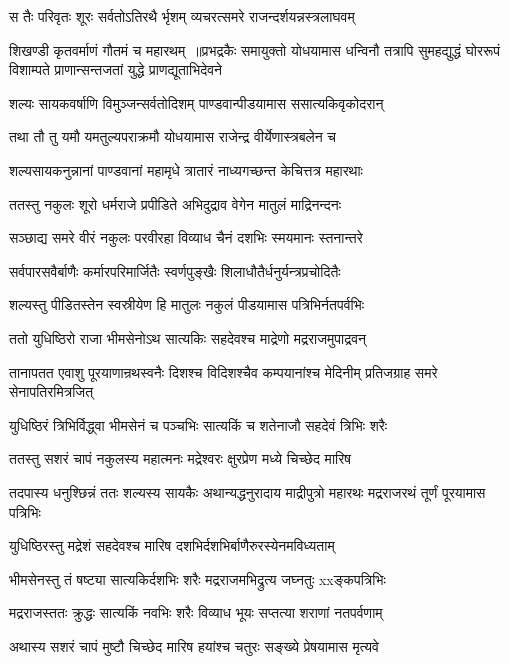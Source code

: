 \twolineshloka
{स तैः परिवृतः शूरः सर्वतोऽतिरथै र्भृशम्}
{व्यचरत्समरे राजन्दर्शयन्नस्त्रलाघवम्}


शिखण्डी कृतवर्माणं गौतमं च महारथम् ॥प्रभद्रकैः समायुक्तो योधयामास धन्विनौ
\twolineshloka
{तत्रापि सुमहद्युद्धं घोररूपं विशाम्पते}
{प्राणान्सन्तजतां युद्धे प्राणद्यूताभिदेवने}


\twolineshloka
{शल्यः सायकवर्षाणि विमुञ्जन्सर्वतोदिशम्}
{पाण्डवान्पीडयामास ससात्यकिवृकोदरान्}


\twolineshloka
{तथा तौ तु यमौ यमतुल्यपराक्रमौ}
{योधयामास राजेन्द्र वीर्येणास्त्रबलेन च}


\twolineshloka
{शल्यसायकनुन्नानां पाण्डवानां महामृधे}
{त्रातारं नाध्यगच्छन्त केचित्तत्र महारथाः}


\twolineshloka
{ततस्तु नकुलः शूरो धर्मराजे प्रपीडिते}
{अभिदुद्राव वेगेन मातुलं माद्रिनन्दनः}


\twolineshloka
{सञ्छाद्य समरे वीरं नकुलः परवीरहा}
{विव्याध चैनं दशभिः स्मयमानः स्तनान्तरे}


\twolineshloka
{सर्वपारसवैर्बाणैः कर्मारपरिमार्जितैः}
{स्वर्णपुङ्खैः शिलाधौतैर्धनुर्यन्त्रप्रचोदितैः}


\twolineshloka
{शल्यस्तु पीडितस्तेन स्वस्रीयेण हि मातुलः}
{नकुलं पीडयामास पत्रिभिर्नतपर्वभिः}


\twolineshloka
{ततो युधिष्ठिरो राजा भीमसेनोऽथ सात्यकिः}
{सहदेवश्च माद्रेणो मद्रराजमुपाद्रवन्}


\threelineshloka
{तानापतत एवाशु पूरयाणान्रथस्वनैः}
{दिशश्च विदिशश्चैव कम्पयानांश्च मेदिनीम्}
{प्रतिजग्राह समरे सेनापतिरमित्रजित्}


\twolineshloka
{युधिष्ठिरं त्रिभिर्विद्ध्वा भीमसेनं च पञ्चभिः}
{सात्यकिं च शतेनाजौ सहदेवं त्रिभिः शरैः}


\twolineshloka
{ततस्तु सशरं चापं नकुलस्य महात्मनः}
{मद्रेश्वरः क्षुरप्रेण मध्ये चिच्छेद मारिष}


\threelineshloka
{तदपास्य धनुश्छिन्नं ततः शल्यस्य सायकैः}
{अथान्यद्धनुरादाय माद्रीपुत्रो महारथः}
{मद्रराजरथं तूर्णं पूरयामास पत्रिभिः}


\twolineshloka
{युधिष्ठिरस्तु मद्रेशं सहदेवश्च मारिष}
{दशभिर्दशभिर्बाणैरुरस्येनमविध्यताम्}


\twolineshloka
{भीमसेनस्तु तं षष्ट्या सात्यकिर्दशभिः शरैः}
{मद्रराजमभिद्रुत्य जघ्नतुः xxङ्कपत्रिभिः}


\twolineshloka
{मद्रराजस्ततः क्रुद्धः सात्यकिं नवभिः शरैः}
{विव्याध भूयः सप्तत्या शराणां नतपर्वणाम्}


\twolineshloka
{अथास्य सशरं चापं मुष्टौ चिच्छेद मारिष}
{हयांश्च चतुरः सङ्ख्ये प्रेषयामास मृत्यवे}


